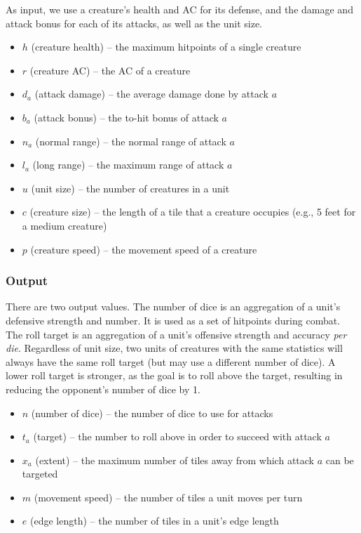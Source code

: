 \documentclass[twocolumn]{article}
\begin{document}
As input, we use a creature's health and AC for its defense,
and the damage and attack bonus for each of its attacks,
as well as the unit size.

\begin{itemize}
    \item $h$ (creature health) -- the maximum hitpoints of a single creature
    \item $r$ (creature AC) -- the AC of a creature
    \item $d_a$ (attack damage) -- the average damage done by attack $a$
    \item $b_a$ (attack bonus) -- the to-hit bonus of attack $a$
    \item $n_a$ (normal range) -- the normal range of attack $a$
    \item $l_a$ (long range) -- the maximum range of attack $a$
    \item $u$ (unit size) -- the number of creatures in a unit
    \item $c$ (creature size) -- the length of a tile that a creature occupies
        (e.g., 5 feet for a medium creature)
    \item $p$ (creature speed) -- the movement speed of a creature
\end{itemize}

\subsubsection{Output}

There are two output values.
The number of dice is an aggregation of a unit's defensive strength and number.
It is used as a set of hitpoints during combat.
The roll target is an aggregation
of a unit's offensive strength and accuracy \emph{per die}.
Regardless of unit size,
two units of creatures with the same statistics
will always have the same roll target
(but may use a different number of dice).
A lower roll target is stronger,
as the goal is to roll above the target,
resulting in reducing the opponent's number of dice by 1.

\begin{itemize}
    \item $n$ (number of dice) -- the number of dice to use for attacks
    \item $t_a$ (target) -- the number to roll above in order to succeed with attack $a$
    \item $x_a$ (extent) -- the maximum number of tiles away from which attack $a$ can be targeted
    \item $m$ (movement speed) -- the number of tiles a unit moves per turn
    \item $e$ (edge length) -- the number of tiles in a unit's edge length
\end{itemize}
\end{document}
